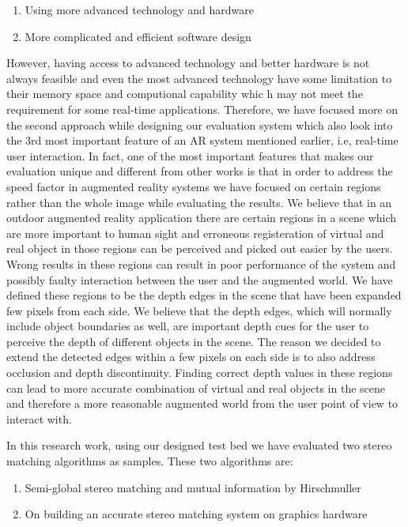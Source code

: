 \documentclass[dvips,letterpaper,12pt]{report}
\begin{document}
\begin{enumerate}
\item Using more advanced technology and hardware
\item More complicated and efficient software design
\end{enumerate}
However, having access to advanced technology and better hardware is not always feasible and even the most advanced technology have some limitation to their memory space and computional capability whic
h may not meet the requirement for some real-time applications. 
Therefore, we have focused more on the second approach while designing our evaluation system which also look into the 3rd most important feature of
an AR system mentioned earlier, i.e, real-time user interaction. \newline In fact, one of the most important features that makes our evaluation unique and different from other works is that in order to
address the speed factor in augmented reality systems we have focused on certain regions rather than the whole image while evaluating the results.
We believe that in an outdoor augmented reality application there are certain regions in a scene which are more important to human sight and erroneous registeration of virtual and 
real object in those regions can be perceived and picked out easier by the users. Wrong results in these regions can result in poor performance of the system and possibly faulty interaction between 
the user and the augmented world. We have defined these regions to be the depth edges in the scene that have been expanded few pixels from each side. 
We believe that the depth edges, which will normally include object boundaries as well, are important depth cues for the user to perceive the depth of different objects in the scene. 
The reason we decided to extend the detected edges within a few pixels on each side is to also address occlusion and depth discontinuity. Finding correct depth values in these regions 
can lead to more accurate combination of virtual and real objects in the scene and therefore a more reasonable augmented world from the user point of view to interact with. \newline

In this research work, using our designed test bed we have evaluated two stereo matching algorithms as samples. These two algorithms are:
\begin{enumerate}
\item Semi-global stereo matching and mutual information by Hirschmuller \cite{hir08}
\item On building an accurate stereo matching system on graphics hardware \cite{mei11}
\end{enumerate}
\end{document}
